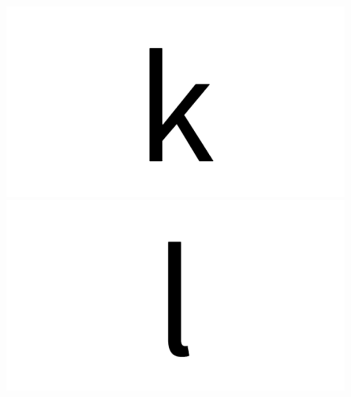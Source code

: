 \documentclass{article}
\begin{document}
\begin{figure}[H]
  \includegraphics[width=\linewidth]{k}
\endminipage\hfill
{}
  \includegraphics[width=\linewidth]{l}
\endminipage\hfill
\end{figure}
\end{document}
